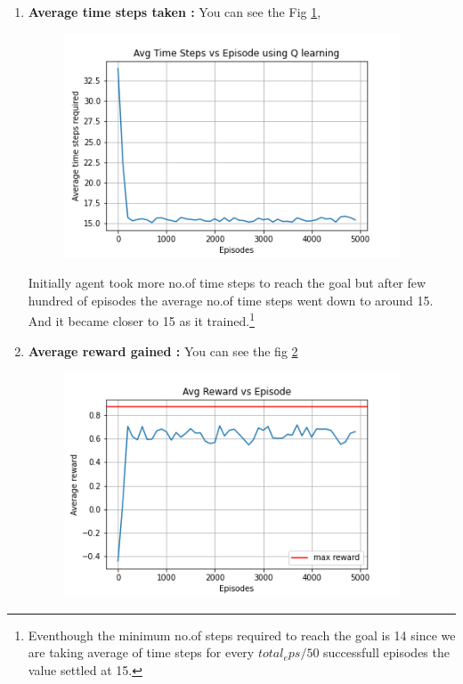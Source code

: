 \documentclass[journal,12pt,onecolumn]{IEEEtran}
\theoremstyle{remark}
\numberwithin{equation}{section}
\begin{document}
\begin{enumerate}
      \item \textbf{Average time steps taken :} You can see the Fig \ref{avg-time-Q},
	  \begin{figure}[ht]
		      \centering
		      \includegraphics[width = 10cm]{Figs/Avg_time_Q.png}
                      \caption{}
		      \label{avg-time-Q}
	      \end{figure}
    Initially agent took more no.of time steps to reach the goal but after few hundred of episodes the average no.of time steps went down to around 15.
    And it became closer to 15 as it trained.\footnote{Eventhough the minimum no.of steps required to reach the goal is 14 since we are taking average of time steps for every $total_eps/50$ successfull episodes the value settled at 15.}
\item \textbf{Average reward gained :} You can see the fig \ref{avg-rew-Q}

	  \begin{figure}
		      \centering
		      \includegraphics[width = 10cm]{Figs/Avg_rew_Q.png}
                      \caption{}
		      \label{avg-rew-Q}
	      \end{figure}


\end{enumerate}
\end{document}
